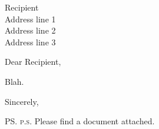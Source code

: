 \documentclass[a4paper,12pt]{letter}
\begin{document}
\begin{letter}
    {
    Recipient \\
    Address line 1 \\
    Address line 2 \\
    Address line 3
    }
\opening{Dear Recipient,}

Blah.

\closing{Sincerely,}

\ps{\textsc{p.s.} Please find a document attached.} %
\end{letter}
\end{document}
